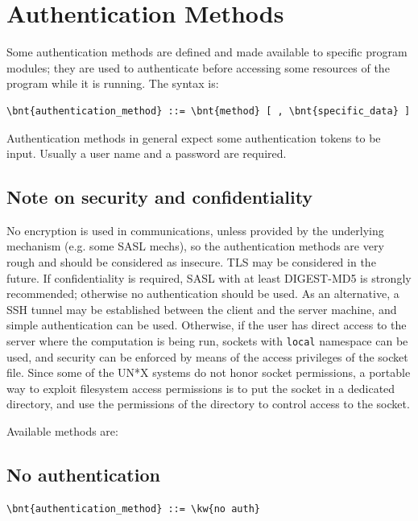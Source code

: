 \section{Authentication Methods}
Some authentication methods are defined and made available to specific
program modules; they are used to authenticate before accessing some
resources of the program while it is running.
The syntax is:
\begin{Verbatim}[commandchars=\\\{\}]
    \bnt{authentication_method} ::= \bnt{method} [ , \bnt{specific_data} ]
\end{Verbatim}
Authentication methods in general expect some authentication tokens to be
input.
Usually a user name and a password are required.

\subsection{Note on security and confidentiality}
No encryption is used in communications, unless provided
by the underlying mechanism (e.g. some SASL mechs), 
so the authentication methods are very rough
and should be considered as insecure.
TLS may be considered in the future.
If confidentiality is required, SASL with at least DIGEST-MD5 
is strongly recommended; otherwise no authentication should be used.
As an alternative, a SSH tunnel may be established between the client
and the server machine, and simple authentication can be used.
Otherwise, if the user has direct access to the server where
the computation is being run, sockets with \texttt{local} namespace
can be used, and security can be enforced by means of the access
privileges of the socket file.
Since some of the UN*X systems do not honor socket permissions,
a portable way to exploit filesystem access permissions is to put
the socket in a dedicated directory, and use the permissions
of the directory to control access to the socket.

Available methods are:
\subsection{No authentication}
\begin{Verbatim}[commandchars=\\\{\}]
    \bnt{authentication_method} ::= \kw{no auth}
\end{Verbatim}

